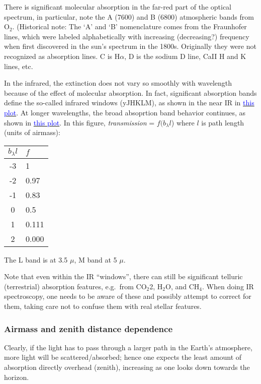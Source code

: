 \documentclass[12pt]{article}
\begin{document}
There is significant molecular absorption in the far-red part of the
optical spectrum, in particular, note the A (7600) and B (6800)
atmospheric bands from O$_2$.
(Historical note: The `A' and `B' nomenclature comes from the
Fraunhofer lines, which were labeled alphabetically with increasing
(decreasing?) frequency when first
discovered in the sun's spectrum in the 1800s. Originally they were
not recognized as absorption lines. C is H$\alpha$, D is the sodium D
line, CaII H and K lines, etc.

In the infrared, the extinction does not vary so smoothly with
wavelength because of the effect of molecular absorption. In fact,
significant absorption bands define the so-called infrared windows
(yJHKLM), as shown in the near IR in
\href{http://astronomy.nmsu.edu/holtz/a535/html/diagrams/a535/mandbell.htm}
{\textcolor{blue}{this plot}}.
At longer wavelengths,
the broad absoprtion band behavior continues, as shown in
\href{http://astronomy.nmsu.edu/holtz/a535/html/diagrams/a535/allen1.htm}
{\textcolor{blue}{this plot}}.
In this figure, \emph{transmission} = $f(b_{\lambda}l$) where $l$
is path length (units of airmass):

\begin{table}[h]
\centering
\begin{tabular}{c l}
$b_{\lambda}l$ & $f$\\
\hline\hline
-3  & 1\\
-2  & 0.97\\
-1  & 0.83\\
0   & 0.5\\
1   & 0.111\\
2   & 0.000\\
\hline
\end{tabular}
\end{table}

The L band is at 3.5 $\mu$, M band at 5 $\mu$.

Note that even within the IR ``windows'', there can still be
significant telluric (terrestrial) absorption features,
e.g.\ from CO$_2$2, H$_2$O, and CH$_4$.
When doing IR spectroscopy, one needs to be aware of these and
possibly attempt to correct for them, taking care not to confuse them
with real stellar features.

\subsubsection*{Airmass and zenith distance dependence}

Clearly, if the light has to pass through a larger path in the Earth's
atmosphere, more light will be scattered/absorbed; hence one expects
the least amount of absorption directly overhead (zenith), increasing
as one looks down towards the horizon.
\end{document}
